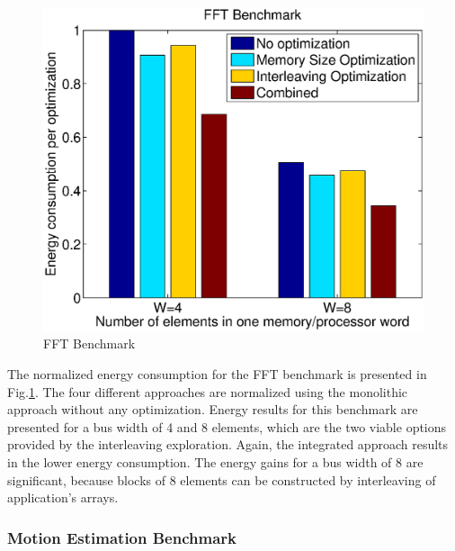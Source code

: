 \documentclass[prodmode,acmtecs]{acmsmall}
\begin{document}
\begin{figure}
\centering
	\includegraphics[scale = 0.5]{Images/fft.eps} 
	\caption{FFT Benchmark}
	\label{fig:fft}
\end{figure}

The normalized energy consumption for the FFT benchmark is presented in Fig.\ref{fig:fft}.
The four different approaches are normalized using the monolithic approach without any optimization.
Energy results for this benchmark are presented for a bus width of 4 and 8 elements, which are the two viable options provided by the interleaving exploration.
Again, the integrated approach results in the lower energy consumption.
The energy gains for a bus width of 8 are significant, because blocks of 8 elements can be constructed by interleaving of application's arrays.

\subsubsection{Motion Estimation Benchmark}
\end{document}
